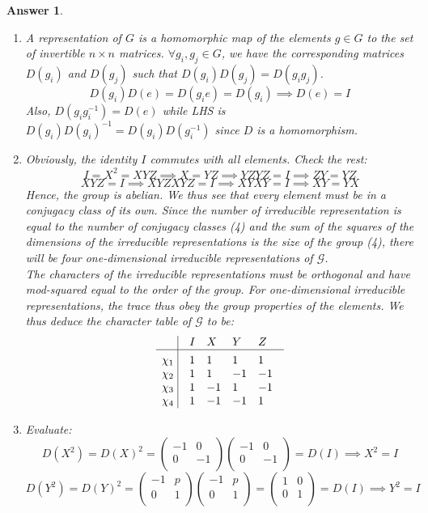 \documentclass[a4paper]{article}
\newtheorem{ans}{Answer}[section]
\theoremstyle{new}
\begin{document}
\begin{ans}\leavevmode
\begin{enumerate}[label=(\alph*)]
\item A representation of $G$ is a homomorphic map of the elements $g\in G$ to the set of invertible $n\times n$ matrices. $\forall g_i,g_j\in G$, we have the corresponding matrices $D(g_i)$ and $D(g_j)$ such that $D(g_i)D(g_j)=D(g_ig_j)$.\\[5pt]
$$D(g_i)D(e)=D(g_ie)=D(g_i)\implies D(e)=I$$
Also, $D(g_ig_i^{-1})=D(e)$ while LHS is $D(g_i)D(g_i)^{-1}=D(g_i)D(g_i^{-1})$ since $D$ is a homomorphism.
\item Obviously, the identity $I$ commutes with all elements. Check the rest:
$$I=X^2=XYZ\implies X=YZ\implies YZYZ=I\implies ZY=YZ$$
$$XYZ=I\implies XYZXYZ=I\implies XYXY=I\implies XY=YX$$
Hence, the group is abelian. We thus see that every element must be in a conjugacy class of its own. Since the number of irreducible representation is equal to the number of conjugacy classes (4) and the sum of the squares of the dimensions of the irreducible representations is the size of the group (4), there will be four one-dimensional irreducible representations of $\mathcal{G}$.\\[5pt]
The characters of the irreducible representations must be orthogonal and have mod-squared equal to the order of the group. For one-dimensional irreducible representations, the trace thus obey the group properties of the elements. We thus deduce the character table of $\mathcal{G}$ to be:
$$\vbox{\tabskip0.5em\offinterlineskip
    \halign{\strut$#$\hfil\ \tabskip1em\vrule&&$#$\hfil\cr
    ~&I&X&Y&Z   \cr
    \noalign{\hrule}\vrule height 12pt width 0pt
     \chi_1&1&1&1&1    \cr
     \chi_2&1&1&-1&-1    \cr
     \chi_3 & 1 &-1  & 1 & -1  \cr
     \chi_4 & 1 & -1 & -1 & 1\cr
}}$$
\item Evaluate:
$$D(X^2)=D(X)^2=\begin{pmatrix}-1&0\\0&-1\\\end{pmatrix}\begin{pmatrix}-1&0\\0&-1\\\end{pmatrix}=D(I)\implies X^2=I$$
$$D(Y^2)=D(Y)^2=\begin{pmatrix}-1&p\\0&1\\\end{pmatrix}\begin{pmatrix}-1&p\\0&1\\\end{pmatrix}=\begin{pmatrix}1&0\\0&1\\\end{pmatrix}=D(I)\implies Y^2=I$$

\end{enumerate}
\end{ans}
\end{document}
